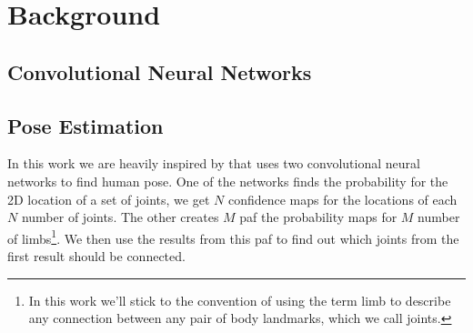 \chapter{Background}

\section{Convolutional Neural Networks}



\section{Pose Estimation}
In this work we are heavily inspired by \cite{cao2017realtime} that uses two convolutional neural networks to find human pose. One of the networks finds the probability for the 2D location of a set of joints, we get $N$ confidence maps for the locations of each $N$ number of joints. The other creates $M$ \gls{paf} the probability maps for $M$ number of limbs\footnote{In this work we'll stick to the convention of using the term limb to describe any connection between any pair of body landmarks, which we call joints.}. We then use the results from this \gls{paf} to find out which joints from the first result should be connected.
